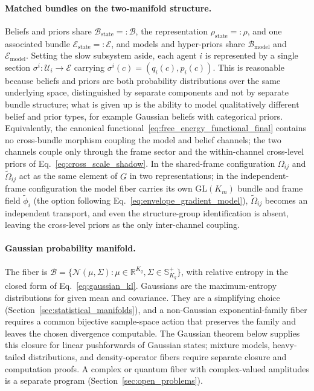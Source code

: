 \documentclass[11pt]{article}
\begin{document}
\paragraph{Matched bundles on the two-manifold structure.}
Beliefs and priors share $\mathcal{B}_{\mathrm{state}} =: \mathcal{B}$, the representation $\rho_{\mathrm{state}} =: \rho$, and one associated bundle $\mathcal{E}_{\mathrm{state}} =: \mathcal{E}$, and models and hyper-priors share $\mathcal{B}_{\mathrm{model}}$ and $\mathcal{E}_{\mathrm{model}}$. Setting the slow subsystem aside, each agent $i$ is represented by a single section $\sigma^i: \mathcal{U}_i \to \mathcal{E}$ carrying $\sigma^i(c) = (q_i(c), p_i(c))$. This is reasonable because beliefs and priors are both probability distributions over the same underlying space, distinguished by separate components and not by separate bundle structure; what is given up is the ability to model qualitatively different belief and prior types, for example Gaussian beliefs with categorical priors. Equivalently, the canonical functional~\eqref{eq:free_energy_functional_final} contains no cross-bundle morphism coupling the model and belief channels; the two channels couple only through the frame sector and the within-channel cross-level priors of Eq.~\eqref{eq:cross_scale_shadow}. In the shared-frame configuration $\Omega_{ij}$ and $\tilde{\Omega}_{ij}$ act as the same element of $G$ in two representations; in the independent-frame configuration the model fiber carries its own $\mathrm{GL}(K_m)$ bundle and frame field $\tilde{\phi}_i$ (the option following Eq.~\eqref{eq:envelope_gradient_model}), $\tilde{\Omega}_{ij}$ becomes an independent transport, and even the structure-group identification is absent, leaving the cross-level priors as the only inter-channel coupling.

\paragraph{Gaussian probability manifold.}
The fiber is $\mathcal{B} = \{\mathcal{N}(\mu, \Sigma) : \mu \in \mathbb{R}^{K_q}, \Sigma \in \mathbb{S}^+_{K_q}\}$, with relative entropy in the closed form of Eq.~\eqref{eq:gaussian_kl}. Gaussians are the maximum-entropy distributions for given mean and covariance. They are a simplifying choice (Section~\ref{sec:statistical_manifolds}), and a non-Gaussian exponential-family fiber requires a common bijective sample-space action that preserves the family and leaves the chosen divergence computable. The Gaussian theorem below supplies this closure for linear pushforwards of Gaussian states; mixture models, heavy-tailed distributions, and density-operator fibers require separate closure and computation proofs. A complex or quantum fiber with complex-valued amplitudes is a separate program (Section~\ref{sec:open_problems}).
\end{document}
